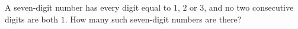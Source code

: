 A seven-digit number has every digit equal to $1$, $2$ or $3$, and no two consecutive digits are both $1$. How many such seven-digit numbers are there?
